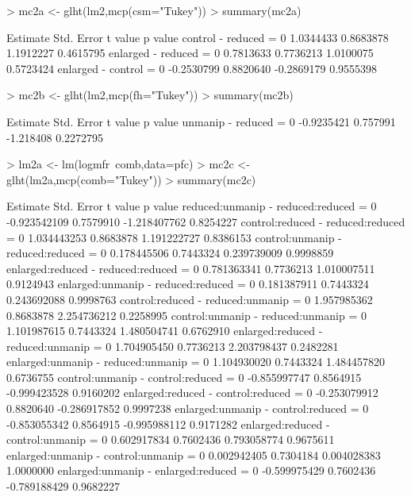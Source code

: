 \documentclass[a4paper]{article}
\begin{document}
\begin{Schunk}
\begin{Sinput}
> mc2a <- glht(lm2,mcp(csm="Tukey"))
> summary(mc2a)
\end{Sinput}
\end{Schunk}
\begin{Schunk}
\begin{Soutput}
                         Estimate Std. Error    t value   p value
control - reduced = 0   1.0344433  0.8683878  1.1912227 0.4615795
enlarged - reduced = 0  0.7813633  0.7736213  1.0100075 0.5723424
enlarged - control = 0 -0.2530799  0.8820640 -0.2869179 0.9555398
\end{Soutput}
\end{Schunk}
\begin{Schunk}
\begin{Sinput}
> mc2b <- glht(lm2,mcp(fh="Tukey"))
> summary(mc2b)
\end{Sinput}
\end{Schunk}
\begin{Schunk}
\begin{Soutput}
                        Estimate Std. Error   t value   p value
unmanip - reduced = 0 -0.9235421   0.757991 -1.218408 0.2272795
\end{Soutput}
\end{Schunk}
\begin{Schunk}
\begin{Sinput}
> lm2a <- lm(logmfr~comb,data=pfc)
> mc2c <- glht(lm2a,mcp(comb="Tukey"))
> summary(mc2c)
\end{Sinput}
\end{Schunk}
\begin{Schunk}
\begin{Soutput}
                                            Estimate Std. Error      t value   p value
reduced:unmanip - reduced:reduced = 0   -0.923542109  0.7579910 -1.218407762 0.8254227
control:reduced - reduced:reduced = 0    1.034443253  0.8683878  1.191222727 0.8386153
control:unmanip - reduced:reduced = 0    0.178445506  0.7443324  0.239739009 0.9998859
enlarged:reduced - reduced:reduced = 0   0.781363341  0.7736213  1.010007511 0.9124943
enlarged:unmanip - reduced:reduced = 0   0.181387911  0.7443324  0.243692088 0.9998763
control:reduced - reduced:unmanip = 0    1.957985362  0.8683878  2.254736212 0.2258995
control:unmanip - reduced:unmanip = 0    1.101987615  0.7443324  1.480504741 0.6762910
enlarged:reduced - reduced:unmanip = 0   1.704905450  0.7736213  2.203798437 0.2482281
enlarged:unmanip - reduced:unmanip = 0   1.104930020  0.7443324  1.484457820 0.6736755
control:unmanip - control:reduced = 0   -0.855997747  0.8564915 -0.999423528 0.9160202
enlarged:reduced - control:reduced = 0  -0.253079912  0.8820640 -0.286917852 0.9997238
enlarged:unmanip - control:reduced = 0  -0.853055342  0.8564915 -0.995988112 0.9171282
enlarged:reduced - control:unmanip = 0   0.602917834  0.7602436  0.793058774 0.9675611
enlarged:unmanip - control:unmanip = 0   0.002942405  0.7304184  0.004028383 1.0000000
enlarged:unmanip - enlarged:reduced = 0 -0.599975429  0.7602436 -0.789188429 0.9682227
\end{Soutput}
\end{Schunk}
\end{document}
